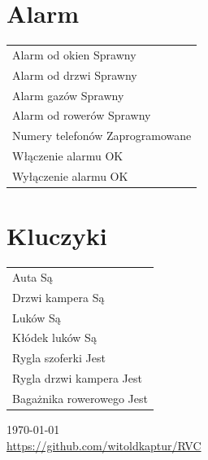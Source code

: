\documentclass{article}
\begin{document}
\begin{multicols}{2}
\section{Alarm}
\begin{tabularx}{\columnwidth}{|X|}
\hline
Alarm od okien \dotfill Sprawny \\
Alarm od drzwi \dotfill Sprawny \\
Alarm gazów \dotfill Sprawny \\
Alarm od rowerów \dotfill Sprawny \\
Numery telefonów \dotfill Zaprogramowane \\
Włączenie alarmu \dotfill OK \\
Wyłączenie alarmu \dotfill OK \\
\hline
\end{tabularx}

\section{Kluczyki}
\begin{tabularx}{\columnwidth}{|X|}
\hline
Auta \dotfill Są \\
Drzwi kampera \dotfill Są \\
Luków \dotfill Są \\
Kłódek luków \dotfill Są \\
Rygla szoferki \dotfill Jest \\
Rygla drzwi kampera \dotfill Jest \\
Bagażnika rowerowego \dotfill Jest \\
\hline
\end{tabularx}


\end{multicols}

\begin{center}
    \today  \\
    \url{https://github.com/witoldkaptur/RVC}
\end{center}
\end{document}
